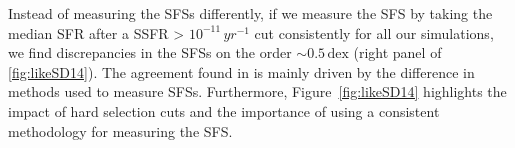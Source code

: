 \documentclass[preprint2,tighten]{aastex62}
\begin{document}
Instead of measuring the SFSs differently, if we measure the SFS by taking the
median SFR after a SSFR > $10^{-11}\,yr^{-1}$ cut consistently for all our 
simulations, we find discrepancies in the SFSs on the order ${\sim}0.5\,\mathrm{dex}$
(right panel of \ref{fig:likeSD14}). The agreement found in \cite{somerville2015b} 
is mainly driven by the difference in methods used to measure SFSs. 
Furthermore, Figure~\ref{fig:likeSD14} highlights the impact of hard selection cuts 
and the importance of using a consistent methodology for measuring the SFS. 

\end{document}
